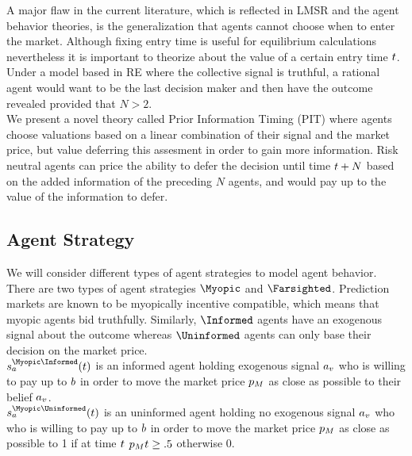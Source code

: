 A major flaw in the current literature, which is reflected in LMSR and the agent behavior theories, is the generalization that agents cannot choose when to enter the market. Although fixing entry time is useful for equilibrium calculations nevertheless it is important to theorize about the value of a certain entry time $t$. Under a model based in RE where the collective signal is truthful, a rational agent would want to be the last decision maker and then have the outcome revealed provided that $N > 2$.\\

We present a novel theory called Prior Information Timing (PIT) where agents choose valuations based on a linear combination of their signal and the market price, but value deferring this assesment in order to gain more information. Risk neutral agents can price the ability to defer the decision until time $t + N$ based on the added information of the preceding $N$ agents, and would pay up to the value of the information to defer. \\


\subsection{Agent Strategy}
We will consider different types of agent strategies to model agent behavior. There are two types of agent strategies  $\Myopic$ and  $\Farsighted$. Prediction markets are known to be myopically incentive compatible, which means that myopic agents bid truthfully. Similarly,  $\Informed$ agents have an exogenous signal about the outcome whereas  $\Uninformed$ agents can only base their decision on the market price. \\

$\AgentStrategy^{\Myopic\Informed}_\Agent(\Time)$ is an informed agent holding exogenous signal $a_v$ who is willing to pay up to $b$ in order to move the market price $p_M$ as close as possible to their belief $a_v$. \\

$\AgentStrategy^{\Myopic\Uninformed}_\Agent(\Time)$ is an uninformed agent holding no exogenous signal $a_v$ who who is willing to pay up to $b$ in order to move the market price $p_M$ as close as possible to 1 if at time $t$ $p_Mt \ge .5$ otherwise 0. \\

